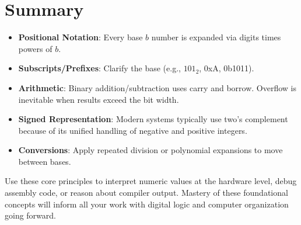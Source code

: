 \documentclass[12pt]{article}
\begin{document}
\section{Summary}
\begin{itemize}
  \item \textbf{Positional Notation}: Every base \(b\) number is expanded via digits times powers of \(b\).
  \item \textbf{Subscripts/Prefixes}: Clarify the base (e.g., \(101_2\), 0xA, 0b1011).
  \item \textbf{Arithmetic}: Binary addition/subtraction uses carry and borrow. Overflow is inevitable when results exceed the bit width.
  \item \textbf{Signed Representation}: Modern systems typically use two's complement because of its unified handling of negative and positive integers.
  \item \textbf{Conversions}: Apply repeated division or polynomial expansions to move between bases.
\end{itemize}

Use these core principles to interpret numeric values at the hardware level, debug assembly code, or reason about compiler output. Mastery of these foundational concepts will inform all your work with digital logic and computer organization going forward.
\end{document}
